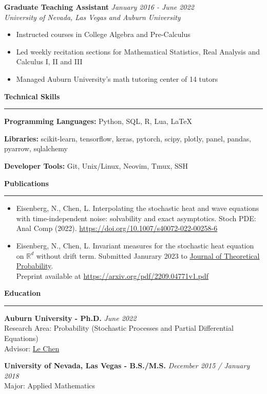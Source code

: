 \documentclass[11pt]{article}
\begin{document}
\textbf{\large Graduate Teaching Assistant}  \hfill \textit{January 2016 - June 2022} \\
\textit{University of Nevada, Las Vegas and Auburn University}
\begin{itemize} \setlength\itemsep{-0.5em}
  \item  Instructed courses in College Algebra and Pre-Calculus
  \item  Led weekly recitation sections for Mathematical Statistics, Real Analysis
  and Calculus I, II and III
  \item Managed Auburn University's math tutoring center of 14 tutors
\end{itemize}

\vspace{.3em}
\textbf{\Large Technical Skills}
\vspace{.3em}
\hrule
\vspace{.3em}

\textbf{Programming Languages:}
Python, SQL, R, Lua, \LaTeX

\textbf{Libraries:} scikit-learn, tensorflow, keras, pytorch, scipy, plotly, panel, 
pandas, pyarrow, sqlalchemy 

\textbf{Developer Tools:} Git, Unix/Linux, Neovim, Tmux, SSH

\vspace{.3em}
\textbf{\Large Publications}
\vspace{.3em}
\hrule
\vspace{.3em}

\begin{itemize}[leftmargin=*]
  \item[1:] Eisenberg, N., Chen, L. Interpolating the stochastic heat and wave equations with
  time-independent noise: solvability and exact asymptotics. Stoch PDE: Anal Comp (2022).
  \href{https://doi.org/10.1007/s40072-022-00258-6}{https://doi.org/10.1007/s40072-022-00258-6}

  \item[2:] Eisenberg, N., Chen, L. Invariant measures for the stochastic heat equation
  on $\mathbb{R}^d$ without drift term.
  Submitted Janurary 2023 to
  \href{https://www.springer.com/journal/10959}{Journal of Theoretical Probability}. \\
  Preprint available at \href{https://arxiv.org/pdf/2209.04771v1.pdf}{https://arxiv.org/pdf/2209.04771v1.pdf} 
\end{itemize}

\vspace{.3em}
\textbf{\Large Education}
\vspace{.3em}
\hrule
\vspace{.3em}


\textbf{Auburn University - Ph.D.} \hfill \textit{June 2022} \\
Research Area: Probability (Stochastic Processes and Partial Differential Equations) \\
Advisor: \href{http://webhome.auburn.edu/~lzc0090/}{Le Chen}

\textbf{University of Nevada, Las Vegas - B.S./M.S.} \hfill \textit{December 2015 / January 2018} \\
Major: Applied Mathematics \\
\end{document}
